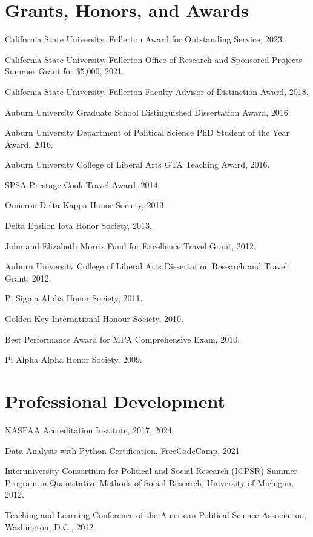 \documentclass[12pt,letterpaper]{article}
\renewenvironment{itemize}{
  \begin{list}{}{
    \setlength{\leftmargin}{1.5em}
    \setlength{\itemsep}{0.25em}
    \setlength{\parskip}{0pt}
    \setlength{\parsep}{0.25em}
  }
}{
  \end{list}
}
\begin{document}
\section*{Grants, Honors, and Awards}
\begin{itemize}\leftmargin=2pt\itemindent=-15pt
  \item California State University, Fullerton Award for Outstanding Service, 2023.
	\item California State University, Fullerton Office of Research and Sponsored Projects Summer Grant for \$5,000, 2021.
	\item California State University, Fullerton Faculty Advisor of Distinction Award, 2018.
	\item Auburn University Graduate School Distinguished Dissertation Award, 2016.
	\item Auburn University Department of Political Science PhD Student of the Year Award, 2016.
	\item Auburn University College of Liberal Arts GTA Teaching Award, 2016.
	\item SPSA Prestage-Cook Travel Award, 2014.
	\item Omicron Delta Kappa Honor Society, 2013.
	\item Delta Epsilon Iota Honor Society, 2013.
	\item John and Elizabeth Morris Fund for Excellence Travel Grant, 2012.
	\item Auburn University College of Liberal Arts Dissertation Research and Travel Grant, 2012.
	\item Pi Sigma Alpha Honor Society, 2011.
	\item Golden Key International Honour Society, 2010.
	\item Best Performance Award for MPA Comprehensive Exam, 2010.
	\item Pi Alpha Alpha Honor Society, 2009.
\end{itemize}

\section*{Professional Development}
\begin{itemize}\leftmargin=2pt\itemindent=-15pt\leftmargin=2pt\itemindent=-15pt
    \item NASPAA Accreditation Institute, 2017, 2024
    \item Data Analysis with Python Certification, FreeCodeCamp, 2021
    \item Interuniversity Consortium for Political and Social Research (ICPSR) Summer Program in Quantitative Methods of Social Research, University of Michigan, 2012. 
    \item Teaching and Learning Conference of the American Political Science Association, Washington, D.C., 2012.
\end{itemize}
\end{document}
